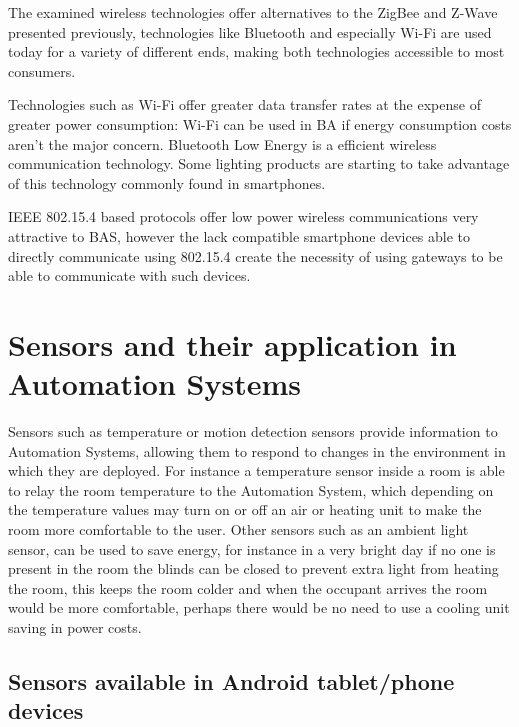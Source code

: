 The examined wireless technologies offer alternatives to the ZigBee and Z-Wave presented previously, technologies like Bluetooth and especially Wi-Fi are used today for a variety of different ends, making both technologies accessible to most consumers.

Technologies such as Wi-Fi offer greater data transfer rates at the expense of greater power consumption: Wi-Fi can be used in BA if energy consumption costs aren't the major concern. Bluetooth Low Energy is a efficient wireless communication technology. Some lighting products are starting to take advantage of this technology commonly found in smartphones.

IEEE 802.15.4 based protocols offer low power wireless communications very attractive to BAS, however the lack compatible smartphone devices able to directly communicate using 802.15.4 create the necessity of using gateways to be able to communicate with such devices.  




\section{Sensors and their application in Automation Systems} \label{ssec:num4}\mbox{}

Sensors such as temperature or motion detection sensors provide information to Automation Systems, allowing them to respond to changes in the environment in which they are deployed. For instance a temperature sensor inside a room is able to relay the room temperature to the Automation System, which depending on the temperature values may turn on or off an air or heating unit to make the room more comfortable to the user.
Other sensors such as an ambient light sensor, can be used to save energy, for instance in a very bright day if no one is present in the room the blinds can be closed to prevent extra light from heating the room, this keeps the room colder and when the occupant arrives the room would be more comfortable, perhaps there would be no need to use a cooling unit saving in power costs.



\subsection{Sensors available in Android tablet/phone devices}\mbox{}\\

